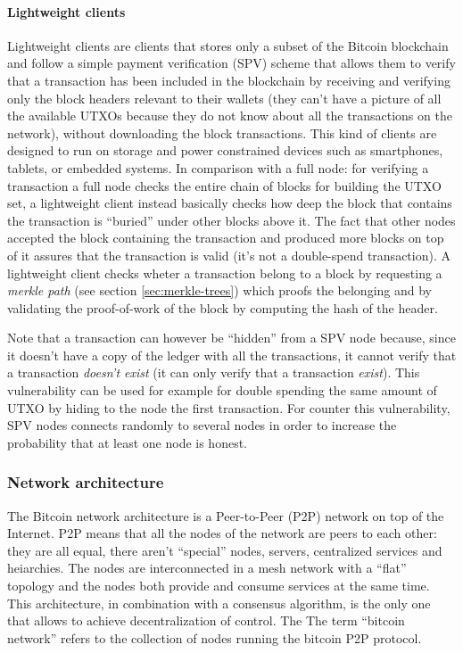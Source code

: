 \paragraph{Lightweight clients} Lightweight clients are clients that stores only
a subset of the Bitcoin blockchain and follow a simple payment verification
(SPV) scheme that allows them to verify that a transaction has been included in
the blockchain by receiving and verifying only the block headers relevant to
their wallets (they can't have a picture of all the available UTXOs because they
do not know about all the transactions on the network), without downloading the
block transactions. This kind of clients are designed to run on storage and
power constrained devices such as smartphones, tablets, or embedded systems. In
comparison with a full node: for verifying a transaction a full node checks the
entire chain of blocks for building the UTXO set, a lightweight client instead
basically checks how deep the block that contains the transaction is ``buried''
under other blocks above it. The fact that other nodes accepted the block
containing the transaction and produced more blocks on top of it assures that
the transaction is valid (it's not a double-spend transaction). A lightweight
client checks wheter a transaction belong to a block by requesting a
\emph{merkle path} (see section \ref{sec:merkle-trees}) which proofs the
belonging and by validating the proof-of-work of the block by computing the hash
of the header.

Note that a transaction can however be ``hidden'' from a SPV node because, since
it doesn't have a copy of the ledger with all the transactions, it cannot verify
that a transaction \emph{doesn't exist} (it can only verify that a transaction
\emph{exist}). This vulnerability can be used for example for double spending
the same amount of UTXO by hiding to the node the first transaction. For counter
this vulnerability, SPV nodes connects randomly to several nodes in order to
increase the probability that at least one node is honest. 

\subsubsection{Network architecture} The Bitcoin network architecture is a
Peer-to-Peer (P2P) network on top of the Internet. P2P means that all the nodes
of the network are peers to each other: they are all equal, there aren't
``special'' nodes, servers, centralized services and heiarchies. The nodes are
interconnected in a mesh network with a ``flat'' topology and the nodes both
provide and consume services at the same time. This architecture, in combination
with a consensus algorithm, is the only one that allows to achieve
decentralization of control. The The term ``bitcoin network'' refers to the
collection of nodes running the bitcoin P2P protocol.

